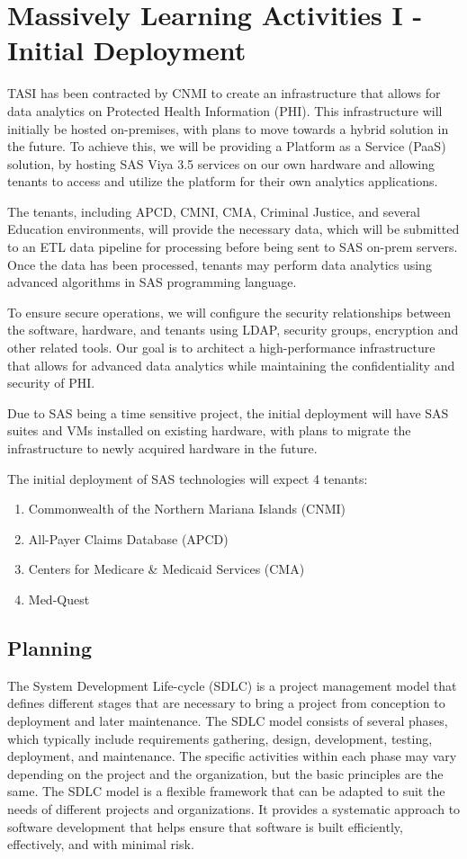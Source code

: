 \section{Massively Learning Activities I - Initial Deployment} \label{section: MLA}
TASI has been contracted by CNMI to create an infrastructure that allows for data analytics on Protected Health Information (PHI). This infrastructure will initially be hosted on-premises, with plans to move towards a hybrid solution in the future. To achieve this, we will be providing a Platform as a Service (PaaS) solution, by hosting SAS Viya 3.5 services on our own hardware and allowing tenants to access and utilize the platform for their own analytics applications.

The tenants, including APCD, CMNI, CMA, Criminal Justice, and several Education environments, will provide the necessary data, which will be submitted to an ETL data pipeline for processing before being sent to SAS on-prem servers. Once the data has been processed, tenants may perform data analytics using advanced algorithms in SAS programming language.

To ensure secure operations, we will configure the security relationships between the software, hardware, and tenants using LDAP, security groups, encryption  and other related tools. Our goal is to architect a high-performance infrastructure that allows for advanced data analytics while maintaining the confidentiality and security of PHI.

Due to SAS being a time sensitive project, the initial deployment will have SAS suites and VMs installed on existing hardware, with plans to migrate the infrastructure to newly acquired hardware in the future.

The initial deployment of SAS technologies will expect 4 tenants:
\begin{enumerate}
    \item Commonwealth of the Northern Mariana Islands (CNMI)
    \item All-Payer Claims Database (APCD)
    \item Centers for Medicare \& Medicaid Services (CMA)
    \item Med-Quest
\end{enumerate}

\subsection{Planning}

The System Development Life-cycle (SDLC) is a project management model that defines different stages that are necessary to bring a project from conception to deployment and later maintenance. The SDLC model consists of several phases, which typically include requirements gathering, design, development, testing, deployment, and maintenance. The specific activities within each phase may vary depending on the project and the organization, but the basic principles are the same. The SDLC model is a flexible framework that can be adapted to suit the needs of different projects and organizations. It provides a systematic approach to software development that helps ensure that software is built efficiently, effectively, and with minimal risk.

